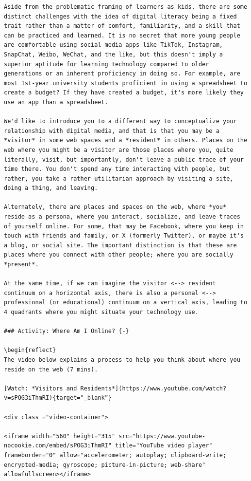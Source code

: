 \documentclass[
]{book}
\theoremstyle{definition}
\theoremstyle{definition}
\theoremstyle{definition}
\theoremstyle{definition}
\theoremstyle{remark}
\begin{document}
\begin{verbatim}
Aside from the problematic framing of learners as kids, there are some distinct challenges with the idea of digital literacy being a fixed trait rather than a matter of comfort, familiarity, and a skill that can be practiced and learned. It is no secret that more young people are comfortable using social media apps like TikTok, Instagram, SnapChat, Weibo, WeChat, and the like, but this doesn't imply a superior aptitude for learning technology compared to older generations or an inherent proficiency in doing so. For example, are most 1st-year university students proficient in using a spreadsheet to create a budget? If they have created a budget, it's more likely they use an app than a spreadsheet.

We'd like to introduce you to a different way to conceptualize your relationship with digital media, and that is that you may be a *visitor* in some web spaces and a *resident* in others. Places on the web where you might be a visitor are those places where you, quite literally, visit, but importantly, don't leave a public trace of your time there. You don't spend any time interacting with people, but rather, you take a rather utilitarian approach by visiting a site, doing a thing, and leaving.

Alternately, there are places and spaces on the web, where *you* reside as a persona, where you interact, socialize, and leave traces of yourself online. For some, that may be Facebook, where you keep in touch with friends and family, or X (formerly Twitter), or maybe it's a blog, or social site. The important distinction is that these are places where you connect with other people; where you are socially *present*.

At the same time, if we can imagine the visitor <--> resident continuum on a horizontal axis, there is also a personal <--> professional (or educational) continuum on a vertical axis, leading to 4 quadrants where you might situate your technology use.

### Activity: Where Am I Online? {-}

\begin{reflect}
The video below explains a process to help you think about where you reside on the web (7 mins).

[Watch: *Visitors and Residents*](https://www.youtube.com/watch?v=sPOG3iThmRI){target="_blank”}

<div class ="video-container">

<iframe width="560" height="315" src="https://www.youtube-nocookie.com/embed/sPOG3iThmRI" title="YouTube video player" frameborder="0" allow="accelerometer; autoplay; clipboard-write; encrypted-media; gyroscope; picture-in-picture; web-share" allowfullscreen></iframe> 


\end{verbatim}
\end{document}

